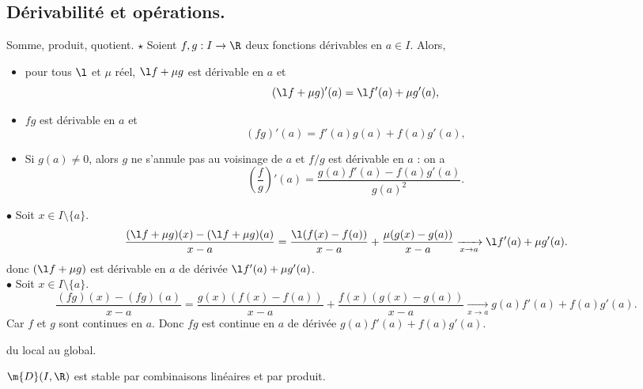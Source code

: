 \documentclass[11pt]{article}
\begin{document}
\pagebreak

\subsection{Dérivabilité et opérations.}

\begin{prop}{Somme, produit, quotient. $\star$}{}
    Soient $f,g:I\to\R$ deux fonctions dérivables en $a\in I$. Alors,
    \begin{itemize}
        \item pour tous $\l$ et $\mu$ réel, $\l f + \mu g$ est dérivable en $a$ et
        \begin{equation*}
            (\l f + \mu g)'(a)=\l f'(a)+\mu g'(a),
        \end{equation*}
        \item $fg$ est dérivable en $a$ et
        \begin{equation*}
            (fg)'(a)=f'(a)g(a)+f(a)g'(a),
        \end{equation*}
        \item Si $g(a)\neq0$, alors $g$ ne s'annule pas au voisinage de $a$ et $f/g$ est dérivable en $a$ : on a
        \begin{equation*}
            \left( \frac{f}{g} \right)'(a)=\frac{g(a)f'(a)-f(a)g'(a)}{g(a)^2}.
        \end{equation*}
    \end{itemize}
    \tcblower
    $\bullet$ Soit $x\in I\setminus\{a\}$.
    \begin{equation*}
        \frac{(\l f + \mu g)(x)-(\l f + \mu g)(a)}{x - a } = \frac{\l(f(x)-f(a))}{x-a}+\frac{\mu(g(x)-g(a))}{x-a}\xrightarrow[x\to a]{}\l f'(a) + \mu g'(a).
    \end{equation*}
    donc $(\l f + \mu g)$ est dérivable en $a$ de dérivée $\l f'(a)+\mu g'(a)$.\\
    $\bullet$ Soit $x\in I\setminus\{a\}$.
    \begin{equation*}
        \frac{(fg)(x)-(fg)(a)}{x-a}=\frac{g(x)(f(x)-f(a))}{x-a}+\frac{f(x)(g(x)-g(a))}{x-a}\xrightarrow[x\to a]{}g(a)f'(a)+f(a)g'(a).
    \end{equation*}
    Car $f$ et $g$ sont continues en $a$. Donc $fg$ est continue en $a$ de dérivée $g(a)f'(a)+f(a)g'(a)$.
\end{prop}

\vspace*{0.4cm}

\begin{corr}{du local au global.}{}
    \begin{center}
        $\m{D}(I,\R)$ est stable par combinaisons linéaires et par produit.
    \end{center}
\end{corr}
\end{document}
